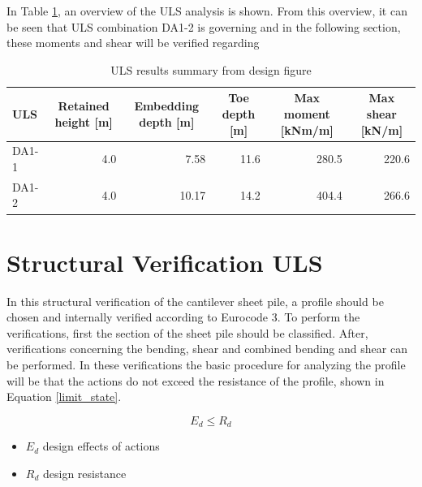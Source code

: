 In Table \ref{tab:uls_summary}, an overview of the ULS analysis is shown. From this overview, it can be seen that ULS combination DA1-2 is governing and in the following section, these moments and shear will be verified regarding 

\begin{table}[H]
  \centering
  \caption{ULS results summary from design figure}
  \label{tab:uls_summary}
  \small
  \setlength{\tabcolsep}{8pt}
  \renewcommand{\arraystretch}{1.15}
  \begin{tabular}{@{}l r r r r r@{}}
    \toprule
    ULS & \multicolumn{1}{c}{Retained height [m]} & \multicolumn{1}{c}{Embedding depth [m]} & \multicolumn{1}{c}{Toe depth [m]} & \multicolumn{1}{c}{Max moment [kNm/m]} & \multicolumn{1}{c}{Max shear [kN/m]} \\
    \midrule
    DA1-1   & 4.0 & 7.58 & 11.6 & 280.5 & 220.6 \\
    DA1-2  & 4.0 & 10.17 & 14.2 & 404.4 & 266.6 \\
    \bottomrule
  \end{tabular}
\end{table}


\section{Structural Verification ULS}

In this structural verification of the cantilever sheet pile, a profile should be chosen and internally verified according to Eurocode 3. To perform the verifications, first the section of the sheet pile should be classified. After, verifications concerning the bending, shear and combined bending and shear can be performed. In these verifications the basic procedure for analyzing the profile will be that the actions do not exceed the resistance of the profile, shown in Equation \ref{limit_state}.


\begin{equation}
    E_{d} \leq R_{d}
    \label{limit_state}
\end{equation}

\begin{itemize}
    \item $E_{d}$    design effects of actions
    \item $R_{d}$   design resistance
\end{itemize}


